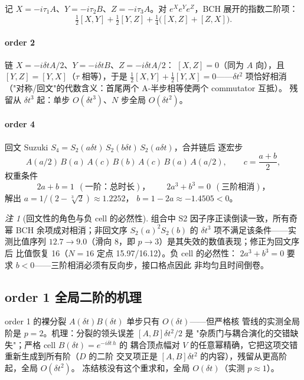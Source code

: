 \documentclass[11pt,a4paper]{ctexart}
\theoremstyle{plain}
\theoremstyle{definition}
\theoremstyle{remark}
\newtheorem{remark}[identity]{注}
\begin{document}
记 $X = -i\tau_1 A$、$Y = -i\tau_2 B$、$Z = -i\tau_3 A$。对
$e^X e^Y e^Z$，BCH 展开的指数二阶项：
\begin{equation}
\tfrac12[X,Y] + \tfrac12[Y,Z] + \tfrac14\big([X,Z] + [Z,X]\big).
\label{eq:bch2}
\end{equation}

\paragraph{order 2}
链 $X = -i\delta t A/2$、$Y = -i\delta t B$、$Z = -i\delta t A/2$：
$[X, Z] = 0$（同为 $A$ 向），且 $[Y,Z] = [Y,X]$（$\tau$ 相等），于是
$\tfrac12[X,Y] + \tfrac12[Y,X] = 0$——$\delta t^2$ 项恰好相消
（"对称/回文"的代数含义：首尾两个 A-半步相等使两个 commutator 互抵）。
残留从 $\delta t^3$ 起：单步 $O(\delta t^3)$、$N$ 步全局 $O(\delta t^2)$。

\paragraph{order 4}
回文 Suzuki $S_4 = S_2(a\delta t)\,S_2(b\delta t)\,S_2(a\delta t)$，合并链后
逐宏步
\begin{equation}
A(a/2)\,B(a)\,A(c)\,B(b)\,A(c)\,B(a)\,A(a/2),
\qquad c = \frac{a + b}{2},
\end{equation}
权重条件
\begin{equation}
2a + b = 1\ \ (\text{一阶：总时长})，\qquad
2a^3 + b^3 = 0\ \ (\text{三阶相消})，
\end{equation}
解出 $a = 1/(2 - \sqrt[3]{2}) \approx 1.2252$，
$b = 1 - 2a \approx -1.4505 < 0$。

\begin{remark}[回文性的角色与负 cell 的必然性]
组合中 S2 因子序正读倒读一致，所有奇幂 BCH 余项成对相消；非回文序
$S_2(a)^2 S_2(b)$ 的 $\delta t^3$ 项不满足该条件——实测比值序列
$12.7 \to 9.0$（滑向 8，即 $p \to 3$）是其失效的数值表现；修正为回文序后
比值恢复 16（$N{=}16$ 定点 15.97/16.12）。负 cell 的必然性：
$2a^3 + b^3 = 0$ 要求 $b < 0$——三阶相消必须有反向步，接口格点因此
非均匀且时间倒卷。
\end{remark}

\subsection{order 1 全局二阶的机理}\label{sec:ord1}

order 1 的裸分裂 $A(\delta t)B(\delta t)$ 单步只有 $O(\delta t)$——但严格核
管线的实测全局阶是 $p = 2$。机理：分裂的领头误差 $[A,B]\delta t^2/2$ 是
"杂质门与耦合演化的交错缺失"；严格 cell $B(\delta t) = e^{-i\delta t\,h}$ 的
耦合顶点幅对 $V$ 的任意幂精确，它把这项交错重新生成到所有阶（$D$ 的二阶
交叉项正是 $[A,B]\delta t^2$ 的内容），残留从更高阶起，全局 $O(\delta t^2)$。
冻结核没有这个重求和，全局 $O(\delta t)$（实测 $p \approx 1$）。
\end{document}

